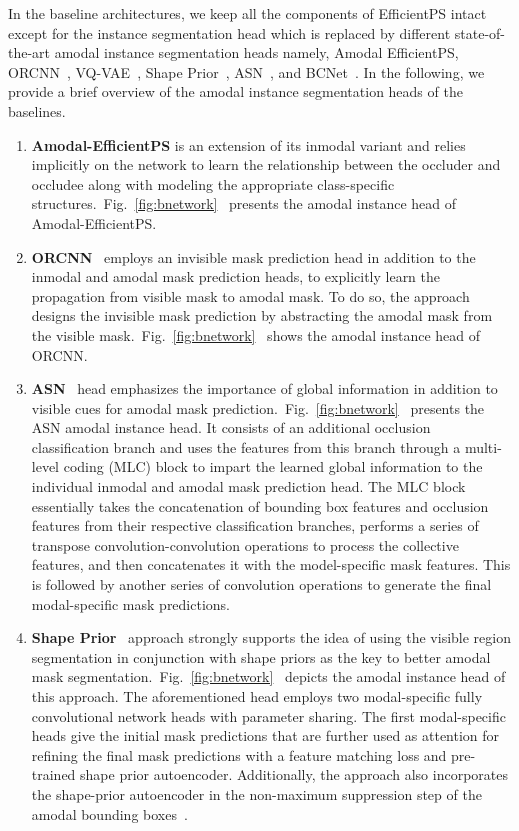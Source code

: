 \documentclass[10pt,twocolumn,letterpaper]{article}
\newcommand{\figref}[1]{Fig.~\ref{#1}}
\begin{document}
In the baseline architectures, we keep all the components of EfficientPS intact except for the instance segmentation head which is replaced by different state-of-the-art amodal instance segmentation heads namely, Amodal EfficientPS, ORCNN~\cite{follmann2019learning}, VQ-VAE~\cite{jang2020learning}, Shape Prior~\cite{yuting2021amodal}, ASN~\cite{qi2019amodal}, and BCNet~\cite{Ke_2021_CVPR}. In the following, we provide a brief overview of the amodal instance segmentation heads of the baselines.

\begin{enumerate}[noitemsep]
\item \textbf{Amodal-EfficientPS} is an extension of its inmodal variant and relies implicitly on the network to learn the relationship between the occluder and occludee along with modeling the appropriate class-specific structures.~\figref{fig:bnetwork}~ presents the amodal instance head of Amodal-EfficientPS.

\item \textbf{ORCNN}~\cite{follmann2019learning} employs an invisible mask prediction head in addition to the inmodal and amodal mask prediction heads, to explicitly learn the propagation from visible mask to amodal mask. To do so, the approach designs the invisible mask prediction by abstracting the amodal mask from the visible mask.~\figref{fig:bnetwork}~ shows the amodal instance head of ORCNN.

\item \textbf{ASN}~\cite{qi2019amodal} head emphasizes the importance of global information in addition to visible cues for amodal mask prediction.~\figref{fig:bnetwork}~ presents the ASN amodal instance head. It consists of an additional occlusion classification branch and uses the features from this branch through a multi-level coding (MLC) block to impart the learned global information to the individual inmodal and amodal mask prediction head. The MLC block essentially takes the concatenation of bounding box features and occlusion features from their respective classification branches, performs a series of transpose convolution-convolution operations to process the collective features, and then concatenates it with the model-specific mask features. This is followed by another series of convolution operations to generate the final modal-specific mask predictions.

\item \textbf{Shape Prior}~\cite{yuting2021amodal} approach strongly supports the idea of using the visible region segmentation in conjunction with shape priors as the key to better amodal mask segmentation.~\figref{fig:bnetwork}~ depicts the amodal instance head of this approach. The aforementioned head employs two modal-specific fully convolutional network heads with parameter sharing. The first modal-specific heads give the initial mask predictions that are further used as attention for refining the final mask predictions with a feature matching loss and pre-trained shape prior autoencoder. Additionally, the approach also incorporates the shape-prior autoencoder in the non-maximum suppression step of the amodal bounding boxes~\cite{ren2015faster}.


\end{enumerate}
\end{document}
